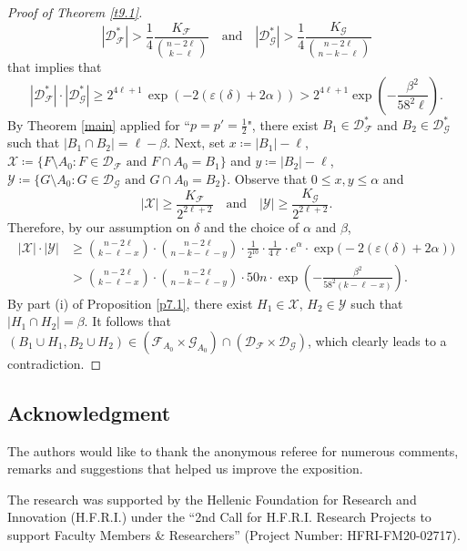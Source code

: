 \documentclass[10pt,a4paper]{amsart}
\theoremstyle{remark}
\newcommand{\ee}{\varepsilon}
\newcommand{\meg}{\geqslant}
\newcommand{\mik}{\leqslant}
\newcommand{\Fcal}{\mathcal{F}}
\newcommand{\Gcal}{\mathcal{G}}
\newcommand{\Dcal}{\mathcal{D}}
\newcommand{\Xcal}{\mathcal{X}}
\newcommand{\Ycal}{\mathcal{Y}}
\begin{document}
\begin{proof}[Proof of Theorem \emph{\ref{t9.1}}]
\begin{equation}
|\Dcal_{\Fcal}^*|>\frac{1}{4} \frac{K_{\Fcal}}{\binom{n-2\ell}{k-\ell}} \ \ \
\text{ and } \ \ \ |\Dcal_{\Gcal}^*|>\frac14 \frac{K_{\Gcal}}{\binom{n-2\ell}{n-k-\ell}}
\end{equation}
that implies that
\begin{equation} \label{e9.19}
|\Dcal_{\Fcal}^*|\cdot |\Dcal_{\Gcal}^*| \meg 2^{4\ell+1}\,
\exp\left(-2(\varepsilon(\delta)+2\alpha)\right) >
2^{4\ell+1}\exp\left(-\frac{\beta^2}{58^2\ell}\right).
\end{equation}
By Theorem \ref{main} applied for ``$p=p'=\frac12$", there exist
$B_1\in \Dcal_{\Fcal}^*$ and $B_2\in \Dcal_{\Gcal}^*$ such that $\left|B_1\cap B_2\right|=\ell-\beta$.
Next, set $x\coloneqq |B_1|-\ell$, $\Xcal\coloneqq \{F\setminus A_0:F\in \Dcal_\Fcal \text{ and } F\cap A_0=B_1\}$ and
$y\coloneqq |B_2|-\ell$, $\Ycal\coloneqq \{G\setminus A_0:G\in \Dcal_\Gcal \text{ and } G\cap A_0=B_2\}$.
Observe that $0\mik x,y\mik\alpha$ and
\begin{equation} \label{e9.20}
|\Xcal|\meg \frac{K_{\Fcal}}{2^{2\ell+2}} \ \ \ \text{ and } \ \ \
|\Ycal|\meg \frac{K_{\Gcal}}{2^{2\ell+2}}.
\end{equation}
Therefore, by our assumption on $\delta$ and the choice of $\alpha$ and $\beta$,
\begin{align}
\label{e9.21} |\Xcal|\cdot |\Ycal| & \meg \binom{n-2\ell}{k-\ell-x}\cdot
\binom{n-2\ell}{n-k-\ell-y}\cdot \frac{1}{2^{10}}\cdot \frac{1}{4\ell}\cdot e^\alpha\cdot
\exp\big(-2(\ee(\delta)+2\alpha)\big) \\
& > \binom{n-2\ell}{k-\ell-x}\cdot \binom{n-2\ell}{n-k-\ell-y}
\cdot 50n\cdot  \exp\left(-\frac{\beta^2}{58^2(k-\ell-x)}\right). \nonumber
\end{align}
By part (i) of Proposition \ref{p7.1}, there exist $H_1\in\Xcal$, $H_2\in \Ycal$ such that $\left|H_1\cap H_2\right|=\beta$.
It follows that $(B_1\cup H_1,B_2\cup H_2)\in (\Fcal_{A_0}\times\Gcal_{A_0})\cap(\Dcal_{\Fcal}\times\Dcal_{\Gcal})$,
which clearly leads to a contradiction.
\end{proof}

\subsection*{Acknowledgment}

The authors would like to thank the anonymous referee for numerous comments, remarks and suggestions
that helped us improve the exposition.

The research was supported by the Hellenic Foundation for Research and Innovation
(H.F.R.I.) under the “2nd Call for H.F.R.I. Research Projects to support
Faculty Members \& Researchers” (Project Number: HFRI-FM20-02717).
\end{document}
